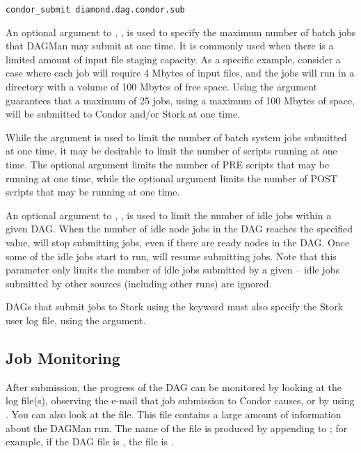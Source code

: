 \begin{verbatim}
condor_submit diamond.dag.condor.sub
\end{verbatim}

An optional argument to , , 
is used to specify the maximum number of batch jobs that DAGMan may
submit at one time.
It is commonly used when 
there is a limited amount of input file staging capacity.
As a specific example, consider a case where each job will
require 4 Mbytes of input files,
and the jobs will run in a directory with a volume of 100 Mbytes
of free space.
Using the argument  guarantees that a maximum
of 25 jobs, using a maximum of 100 Mbytes of space,
will be submitted to Condor and/or Stork at one time.

While the  argument is used to limit the number
of batch system jobs submitted at one time,
it may be desirable to limit the number of scripts running
at one time.
The optional  argument limits the number of PRE
scripts that may be running at one time,
while the optional  argument limits the number of POST
scripts that may be running at one time.

An optional argument to , , 
is used to limit the number of idle jobs within a given DAG.
When the number of idle node jobs in the DAG reaches the specified
value,  will stop submitting jobs, even if there
are ready nodes in the DAG.  Once some of the idle jobs start to
run,  will resume submitting jobs.  Note that this
parameter only limits the number of idle jobs submitted by a
given  -- idle jobs submitted by other sources
(including other  runs) are ignored.

DAGs that submit jobs to Stork using the  keyword must also
specify the Stork user log file, using the  argument.

\subsection{Job Monitoring}

After submission, the progress of the DAG can be monitored
by looking at the log file(s),
observing the e-mail that job submission to Condor causes,
or by using  .
You can also look at the  file.  This file
contains a large amount of information about the DAGMan run.
The name of the  file is produced by appending
 to ; for example, if the
DAG file is , the  file is
.

